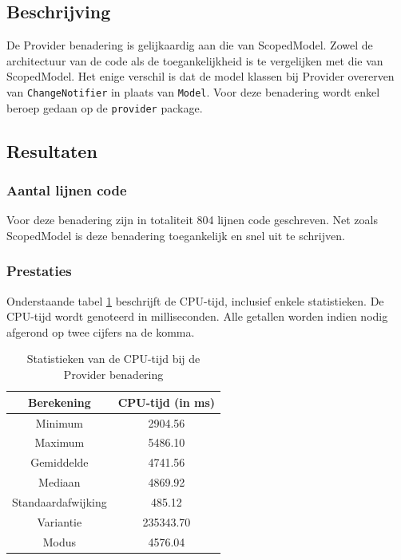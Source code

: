 \subsection{Beschrijving}
De Provider benadering is gelijkaardig aan die van ScopedModel. Zowel de architectuur van de code als de toegankelijkheid is te vergelijken met die van ScopedModel. Het enige verschil is dat de model klassen bij Provider overerven van \verb|ChangeNotifier| in plaats van \verb|Model|. \newline \newline
Voor deze benadering wordt enkel beroep gedaan op de \verb|provider| package. 

\subsection{Resultaten}
\subsubsection{Aantal lijnen code}
Voor deze benadering zijn in totaliteit 804 lijnen code geschreven. Net zoals ScopedModel is deze benadering toegankelijk en snel uit te schrijven.

\subsubsection{Prestaties}
Onderstaande tabel \ref{table:experiment-provider-statistics} beschrijft de CPU-tijd, inclusief enkele statistieken. De CPU-tijd wordt genoteerd in milliseconden. Alle getallen worden indien nodig afgerond op twee cijfers na de komma.
\begin{table}[H]
    \centering
    \begin{tabular}{c|c}
        \textbf{Berekening} & \textbf{CPU-tijd (in ms)}  \\ \hline
        Minimum             & 2904.56                    \\ \hline
        Maximum             & 5486.10                    \\ \hline
        Gemiddelde          & 4741.56                    \\ \hline
        Mediaan             & 4869.92                    \\ \hline
        Standaardafwijking  & 485.12                     \\ \hline
        Variantie           & 235343.70                  \\ \hline
        Modus               & 4576.04                      \\                
    \end{tabular}
    \caption{Statistieken van de CPU-tijd bij de Provider benadering}
    \label{table:experiment-provider-statistics}
\end{table}

